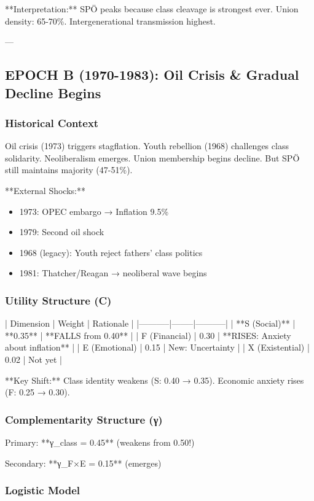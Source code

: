 **Interpretation:** SPÖ peaks because class cleavage is strongest ever. Union density: 65-70\%. Intergenerational transmission highest.

---

\subsection{EPOCH B (1970-1983): Oil Crisis \& Gradual Decline Begins}

\subsubsection{Historical Context}

Oil crisis (1973) triggers stagflation. Youth rebellion (1968) challenges class solidarity. Neoliberalism emerges. Union membership begins decline. But SPÖ still maintains majority (47-51\%).

**External Shocks:**
\begin{itemize}
\item 1973: OPEC embargo → Inflation 9.5\%
\item 1979: Second oil shock
\item 1968 (legacy): Youth reject fathers' class politics
\item 1981: Thatcher/Reagan → neoliberal wave begins
\end{itemize}

\subsubsection{Utility Structure (C)}

| Dimension | Weight | Rationale |
|-----------|--------|-----------|
| **S (Social)** | **0.35** | **FALLS from 0.40** |
| F (Financial) | 0.30 | **RISES: Anxiety about inflation** |
| E (Emotional) | 0.15 | New: Uncertainty |
| X (Existential) | 0.02 | Not yet |

**Key Shift:** Class identity weakens (S: 0.40 → 0.35). Economic anxiety rises (F: 0.25 → 0.30).

\subsubsection{Complementarity Structure (γ)}

Primary: **γ_class = 0.45** (weakens from 0.50!)

Secondary: **γ_{F×E} = 0.15** (emerges)

\subsubsection{Logistic Model}


